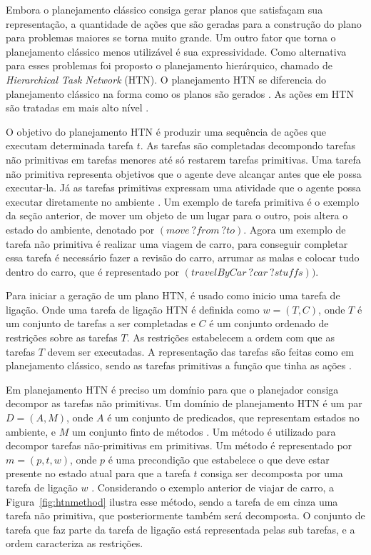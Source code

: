 Embora o planejamento clássico consiga gerar planos que satisfaçam sua representação, a quantidade de ações que são geradas para a construção do plano para problemas maiores se torna muito grande. Um outro fator que torna o planejamento clássico menos utilizável é sua expressividade. Como alternativa para esses problemas foi proposto o planejamento hierárquico, chamado de \textit{Hierarchical Task Network} (HTN). O planejamento HTN se diferencia do planejamento clássico na forma como os planos são gerados \cite{ghallab2004automated}. As ações em HTN são tratadas em mais alto nível \cite{intelligence2003modern}.  

O objetivo do planejamento HTN é produzir uma sequência de ações que executam determinada tarefa $t$. As tarefas são completadas decompondo tarefas não primitivas em tarefas menores até só restarem tarefas primitivas. Uma tarefa não primitiva representa objetivos que o agente deve alcançar antes que ele possa executar-la. Já as tarefas primitivas expressam uma atividade que o agente possa executar diretamente no ambiente \cite{intelligence2003modern}. Um exemplo de tarefa primitiva é o exemplo da seção anterior, de mover um objeto de um lugar para o outro, pois altera o estado do ambiente, denotado por $(move~ ?from~ ?to)$. Agora um exemplo de tarefa não primitiva é realizar uma viagem de carro, para conseguir completar essa tarefa é necessário fazer a revisão do carro, arrumar as malas e colocar tudo dentro do carro, que é representado por $(travelByCar ~?car~ ?stuffs))$. 

Para iniciar a geração de um plano HTN, é usado como inicio uma tarefa de ligação. Onde uma tarefa de ligação HTN é definida como $w = (T, C)$, onde $T$ é um conjunto de tarefas a ser completadas e $C$ é um conjunto ordenado de restrições sobre as tarefas $T$. As restrições estabelecem a ordem com que as tarefas $T$ devem ser executadas. A representação das tarefas são feitas como em planejamento clássico, sendo as tarefas primitivas a função que tinha as ações \cite{meneguzzi2015planning}.  

Em planejamento HTN é preciso um domínio para que o planejador consiga decompor as tarefas não primitivas. Um domínio de planejamento HTN é um par $D = (A, M)$, onde $A$ é um conjunto de predicados, que representam estados no ambiente, e $M$ um conjunto finto de métodos \cite{meneguzzi2015planning}. Um método é utilizado para decompor tarefas não-primitivas em primitivas. Um método é representado por $m = (p, t, w)$, onde $p$ é uma precondição que estabelece o que deve estar presente no estado atual para que a tarefa $t$ consiga ser decomposta por uma tarefa de ligação $w$ \cite{ghallab2004automated}. Considerando o exemplo anterior de viajar de carro, a Figura~\ref{fig:htnmethod} ilustra esse método, sendo a tarefa de em cinza uma tarefa não primitiva, que posteriormente também será decomposta. O conjunto de tarefa que faz parte da tarefa de ligação está representada pelas sub tarefas, e a ordem caracteriza as restrições. 

